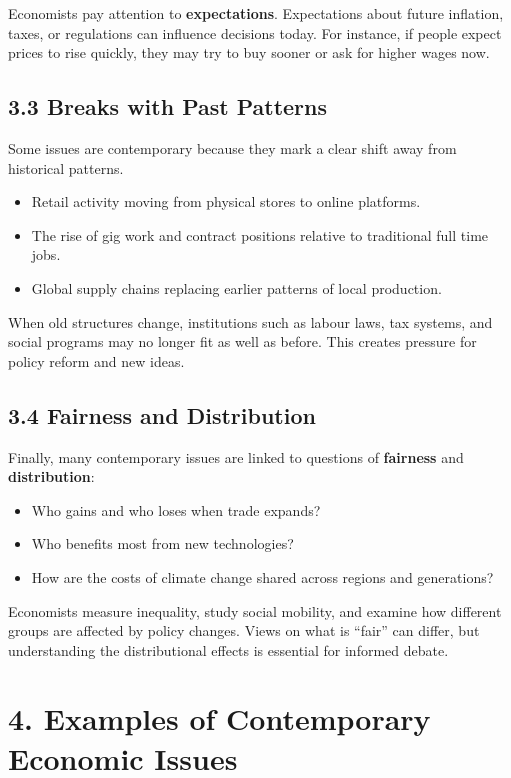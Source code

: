\documentclass[12pt]{article}
\begin{document}
Economists pay attention to \textbf{expectations}. Expectations about future inflation, taxes, or regulations can influence decisions today. For instance, if people expect prices to rise quickly, they may try to buy sooner or ask for higher wages now.

\subsection*{3.3 Breaks with Past Patterns}

Some issues are contemporary because they mark a clear shift away from historical patterns.

\begin{itemize}[noitemsep]
    \item Retail activity moving from physical stores to online platforms.
    \item The rise of gig work and contract positions relative to traditional full time jobs.
    \item Global supply chains replacing earlier patterns of local production.
\end{itemize}

When old structures change, institutions such as labour laws, tax systems, and social programs may no longer fit as well as before. This creates pressure for policy reform and new ideas.

\subsection*{3.4 Fairness and Distribution}

Finally, many contemporary issues are linked to questions of \textbf{fairness} and \textbf{distribution}:

\begin{itemize}[noitemsep]
    \item Who gains and who loses when trade expands?
    \item Who benefits most from new technologies?
    \item How are the costs of climate change shared across regions and generations?
\end{itemize}

Economists measure inequality, study social mobility, and examine how different groups are affected by policy changes. Views on what is ``fair'' can differ, but understanding the distributional effects is essential for informed debate.
\newpage
\section*{4. Examples of Contemporary Economic Issues}
\end{document}
